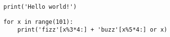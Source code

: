 \documentclass{article}
\begin{document}
\lstinline[style = python]|print('Hello world!')|
\begin{lstlisting}[style = python]
for x in range(101):
    print('fizz'[x%3*4:] + 'buzz'[x%5*4:] or x)
\end{lstlisting}
\end{document}
